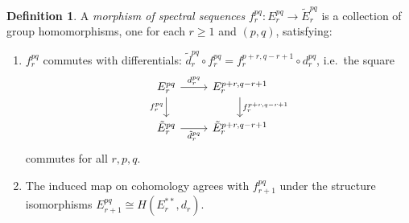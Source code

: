 \documentclass[12pt,a4paper]{article}
\theoremstyle{definition}
\newtheorem{definition}[theorem]{Definition}
\begin{document}
\begin{definition}\label{def:SS-morphism}
A \emph{morphism of spectral sequences} $f_r^{pq}:E_r^{pq}\to\tilde{E}_r^{pq}$
is a collection of group homomorphisms, one for each $r\geq 1$ and $(p,q)$,
satisfying:
\begin{enumerate}
  \item $f_r^{pq}$ commutes with differentials:
    $\tilde{d}_r^{pq}\circ f_r^{pq}=f_r^{p+r,q-r+1}\circ d_r^{pq}$, i.e.\
    the square
    \[
    \begin{tikzcd}
      E_r^{pq} \ar[r,"d_r^{pq}"] \ar[d,"f_r^{pq}"'] &
        E_r^{p+r,q-r+1} \ar[d,"f_r^{p+r,q-r+1}"] \\
      \tilde{E}_r^{pq} \ar[r,"\tilde{d}_r^{pq}"'] &
        \tilde{E}_r^{p+r,q-r+1}
    \end{tikzcd}
    \]
    commutes for all $r,p,q$.
  \item The induced map on cohomology agrees with $f_{r+1}^{pq}$ under the
    structure isomorphisms $E_{r+1}^{pq}\cong H(E_r^{**},d_r)$.
\end{enumerate}
\end{definition}
\end{document}

